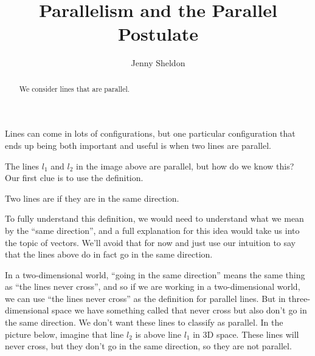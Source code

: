 \documentclass{ximera}
\title{Parallelism and the Parallel Postulate}
\author{Jenny Sheldon}
\begin{document}
\begin{abstract}
We consider lines that are parallel.
\end{abstract}
\maketitle

Lines can come in lots of configurations, but one particular configuration that ends up being both important and useful is when two lines are parallel.
\begin{image}
\end{image}


The lines $l_1$ and $l_2$ in the image above are parallel, but how do we know this? Our first clue is to use the definition.
\begin{definition}
	Two lines are  if they are in the same direction.
\end{definition}

To fully understand this definition, we would need to understand what we mean by the ``same direction'', and a full explanation for this idea would take us into the topic of vectors. We'll avoid that for now and just use our intuition to say that the lines above do in fact go in the same direction.

In a two-dimensional world, ``going in the same direction'' means the same thing as ``the lines never cross'', and so if we are working in a two-dimensional world, we can use ``the lines never cross'' as the definition for parallel lines. But in three-dimensional space we have something called  that never cross but also don't go in the same direction. We don't want these lines to classify as parallel. In the picture below, imagine that line $l_2$ is above line $l_1$ in 3D space. These lines will never cross, but they don't go in the same direction, so they are not parallel.
\begin{image}
\end{image} 
\end{document}
